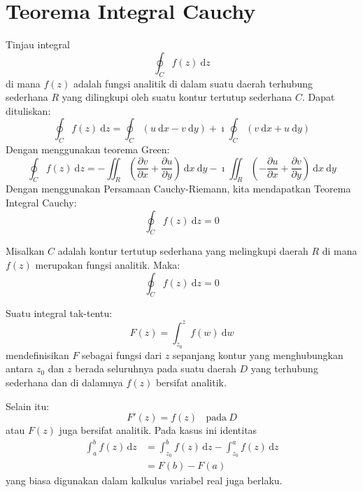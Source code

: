 \section{Teorema Integral Cauchy}


Tinjau integral
\begin{equation*}
\oint_{C}f(z)\ \mathrm{d}z
\end{equation*}
di mana $f(z)$ adalah fungsi analitik di dalam suatu daerah terhubung
sederhana $R$ yang dilingkupi oleh suatu kontur tertutup sederhana
$C$. Dapat dituliskan:
\begin{equation*}
\oint_{C}f(z)\ \mathrm{d}z =
\oint_{C} \left( u\ \mathrm{d}x-v\ \mathrm{d}y \right) +
\imath \oint_{C} \left( v\ \mathrm{d}x + u\ \mathrm{d}y \right)
\end{equation*}
Dengan menggunakan teorema Green:
\begin{equation*}
\oint_{C}f(z)\ \mathrm{d}z = -\iint_{R} \left(\frac{\partial v}{\partial x} +
\frac{\partial u}{\partial y}\right)\ \mathrm{d}x\ \mathrm{d}y -
\imath\iint_{R}\left(-\frac{\partial u}{\partial x} +
\frac{\partial v}{\partial y}\right)\ \mathrm{d}x\ \mathrm{d}y
\end{equation*}
Dengan menggunakan Persamaan Cauchy-Riemann, kita mendapatkan Teorema
Integral Cauchy:
\begin{equation*}
\oint_{C} f(z)\ \mathrm{d}z = 0
\end{equation*}

\begin{theorem}
Misalkan $C$ adalah kontur tertutup sederhana yang melingkupi daerah
$R$ di mana $f(z)$ merupakan fungsi analitik. Maka:
\begin{equation*}
\oint_{C}f(z)\ \mathrm{d}z = 0
\end{equation*}
\end{theorem}

Suatu integral tak-tentu:
\begin{equation*}
F(z)=\int_{z_{0}}^{z}f(w)\ \mathrm{d}w
\end{equation*}
mendefinisikan $F$ sebagai fungsi dari $z$ sepanjang kontur yang
menghubungkan antara $z_{0}$ dan $z$ berada seluruhnya pada suatu
daerah $D$ yang terhubung sederhana dan di dalamnya $f(z)$ bersifat
analitik.

Selain itu:
\begin{equation*}
F'(z) = f(z)\ \ \ \ \text{pada}\ D
\end{equation*}
atau $F(z)$ juga bersifat analitik.
Pada kasus ini identitas
\begin{align*}
\int_{a}^{b} f(z)\,\mathrm{d}z & = \int_{z_0}^{b} f(z)\,\mathrm{d}z - \int_{z_0}^{a} f(z)\,\mathrm{d}z \\
& = F(b) - F(a)
\end{align*}
yang biasa digunakan dalam kalkulus variabel real juga berlaku.



